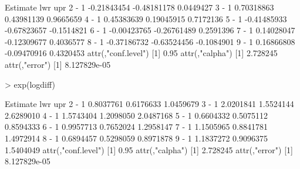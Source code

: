 \documentclass[a4paper]{article}
\begin{document}
\begin{Schunk}
\begin{Soutput}
         Estimate         lwr        upr
2 - 1 -0.21843454 -0.48181178  0.0449427
3 - 1  0.70318863  0.43981139  0.9665659
4 - 1  0.45383639  0.19045915  0.7172136
5 - 1 -0.41485933 -0.67823657 -0.1514821
6 - 1 -0.00423765 -0.26761489  0.2591396
7 - 1  0.14028047 -0.12309677  0.4036577
8 - 1 -0.37186732 -0.63524456 -0.1084901
9 - 1  0.16866808 -0.09470916  0.4320453
attr(,"conf.level")
[1] 0.95
attr(,"calpha")
[1] 2.728245
attr(,"error")
[1] 8.127829e-05
\end{Soutput}
\begin{Sinput}
> exp(logdiff)
\end{Sinput}
\begin{Soutput}
       Estimate       lwr       upr
2 - 1 0.8037761 0.6176633 1.0459679
3 - 1 2.0201841 1.5524144 2.6289010
4 - 1 1.5743404 1.2098050 2.0487168
5 - 1 0.6604332 0.5075112 0.8594333
6 - 1 0.9957713 0.7652024 1.2958147
7 - 1 1.1505965 0.8841781 1.4972914
8 - 1 0.6894457 0.5298059 0.8971878
9 - 1 1.1837272 0.9096375 1.5404049
attr(,"conf.level")
[1] 0.95
attr(,"calpha")
[1] 2.728245
attr(,"error")
[1] 8.127829e-05
\end{Soutput}
\end{Schunk}
\end{document}
